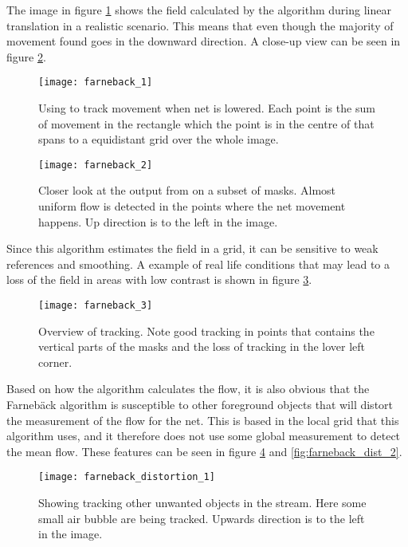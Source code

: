 The image in figure \ref{fig:farneback_1} shows the field calculated 
by the algorithm during linear translation in a realistic scenario. This means 
that even though the majority of movement found goes in the 
downward direction. A close-up view can be seen in figure \ref{fig:farneback_2}.

\begin{figure}[htbp]
	\centering
	\texttt{[image: farneback\_1]}
	\caption{Using \citet{farnebackSCIA03} to track movement when net is lowered. Each point is the sum of movement in the 
		rectangle which the point is in the centre of that spans to a equidistant grid over the whole image.}
	\label{fig:farneback_1}
\end{figure}

\begin{figure}[htbp]
	\centering
	\texttt{[image: farneback\_2]}
	\caption{Closer look at the output from \citet{farnebackSCIA03} on a subset of masks. Almost uniform flow 
		is detected in the points where the net movement happens. Up direction is to the left in the image.}
	\label{fig:farneback_2}
\end{figure}

Since this algorithm estimates the field in a grid, it can be 
sensitive to weak references and smoothing. A example of real life conditions 
that may lead to a loss of the field in areas with low contrast is shown in 
figure \ref{fig:farneback_3}.

\begin{figure}[htbp]
	\centering
	\texttt{[image: farneback\_3]}
	\caption{Overview of tracking. Note good tracking in points that contains the vertical parts of the masks and the loss of tracking in 
		the lover left corner.}
	\label{fig:farneback_3}
\end{figure}

Based on how the algorithm calculates the flow, it is also obvious that the Farnebäck algorithm 
is susceptible to other foreground objects that will distort the measurement of the flow for the net. 
This is based in the local grid that this algorithm uses, and it therefore does 
not use some global measurement to detect the mean flow. These features can be seen in figure \ref{fig:farneback_dist_1} and 
\ref{fig:farneback_dist_2}.

\begin{figure}[htbp]
	\centering
	\texttt{[image: farneback\_distortion\_1]}
	\caption{Showing \citet{farnebackSCIA03} tracking other unwanted objects in the stream. Here some small air bubble are being tracked. 
		Upwards direction is to the left in the image.}
	\label{fig:farneback_dist_1}
\end{figure}

